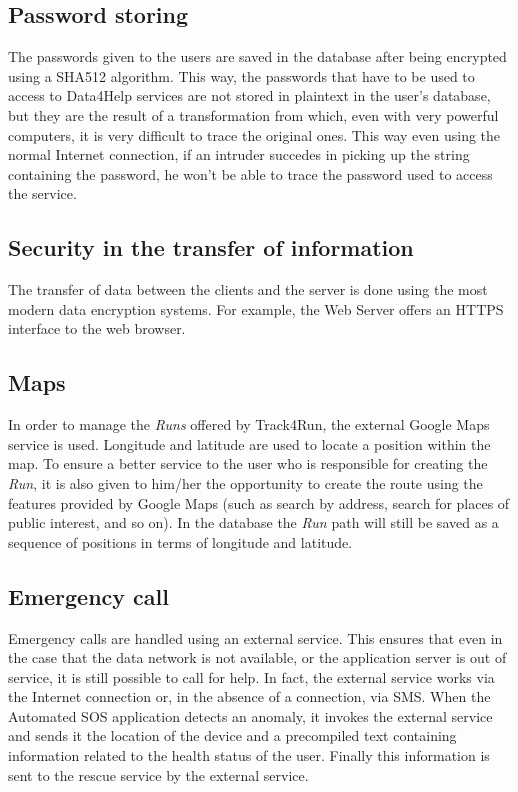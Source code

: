 \subsection{Password storing}
The passwords given to the users are saved in the database after being encrypted using a SHA512 algorithm.
This way, the passwords that have to be used to access to Data4Help services are not stored in plaintext in the user's database, but they are the result of a transformation from which, even with very powerful computers, it is very difficult to trace the original ones.
This way even using the normal Internet connection, if an intruder succedes in picking up the string containing the password, he won't be able to trace the password used to access the service.

\subsection{Security in the transfer of information}
The transfer of data between the clients and the server is done using the most modern data encryption systems.
For example, the Web Server offers an HTTPS interface to the web browser.

\subsection{Maps}
In order to manage the \textit{Runs} offered by Track4Run, the external Google Maps service is used.
Longitude and latitude are used to locate a position within the map.
To ensure a better service to the user who is responsible for creating the \textit{Run}, it is also given to him/her the opportunity to create the route using the features provided by Google Maps (such as search by address, search for places of public interest, and so on). In the database the \textit{Run} path will still be saved as a sequence of positions in terms of longitude and latitude.

\subsection{Emergency call}
Emergency calls are handled using an external service.
This ensures that even in the case that the data network is not available, or the application server is out of service, it is still possible to call for help.
In fact, the external service works via the Internet connection or, in the absence of a connection, via SMS.
When the Automated SOS application detects an anomaly, it invokes the external service and sends it the location of the device and a precompiled text containing information related to the health status of the user.
Finally this information is sent to the rescue service by the external service.
